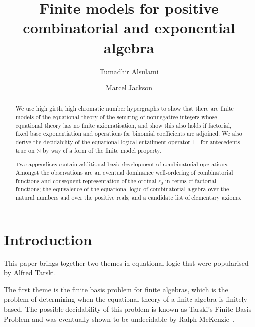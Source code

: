 \documentclass[eqnor,reqno]{amsart}
\theoremstyle{plain}
\theoremstyle{definition}
\begin{document}
\title[]{Finite models for positive combinatorial and exponential algebra}
\author{Tumadhir Alsulami}
\address{Department of Mathematical and Physical Sciences, La Trobe University, Victoria  3086,
Australia and
Department of Mathematics, Umm AlQura University, Makkah, Saudi Arabia} 
\author{Marcel Jackson}
\address{Department of Mathematical and Physical Sciences, La Trobe University, Victoria  3086,
Australia} 





\begin{abstract}
We use high girth, high chromatic number hypergraphs to show that there are finite models of the equational theory of the semiring of nonnegative integers whose equational theory has no finite axiomatisation, and show this also holds if factorial, fixed base exponentiation and operations for binomial coefficients are adjoined.  We also  derive the decidability of the equational logical entailment operator $\vdash$ for  antecedents true on $\mathbb{N}$ by way of a form of the finite model property.  

Two appendices contain additional basic development of combinatorial operations.  Amongst the observations are an eventual dominance well-ordering of combinatorial functions and consequent representation of the ordinal $\epsilon_0$ in terms of factorial functions; the equivalence of the equational logic of combinatorial algebra over the natural numbers and over the positive reals; and a candidate list of elementary axioms.
\end{abstract}


\maketitle

\section{Introduction}
This paper brings together two themes in equational logic that were popularised by Alfred Tarski.  

The first theme is the finite basis problem for finite algebras, which is the problem of determining when the equational theory of a finite algebra is finitely based.  
The possible decidability of this problem is known as Tarski's Finite Basis Problem and was eventually shown to be undecidable by Ralph McKenzie~\cite{mck}.  
\end{document}
